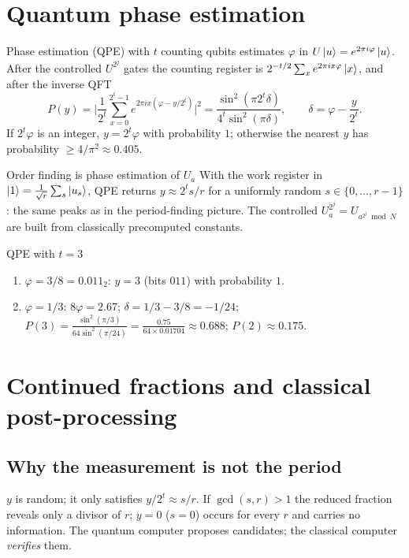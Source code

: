 \documentclass[11pt,a4paper,openany]{book}
\newcounter{wex}[chapter]
\newenvironment{steps}{\begin{enumerate}[label=\textbf{Step \arabic*.}, leftmargin=4.2em, itemsep=2pt]}{\end{enumerate}}
\begin{document}
\section{Quantum phase estimation}
Phase estimation (QPE) with $t$ counting qubits estimates $\varphi$ in $U\ket u = e^{2\pi i\varphi}\ket u$. After the controlled $U^{2^j}$ gates the counting register
is $2^{-t/2}\sum_xe^{2\pi ix\varphi}\ket x$, and after the inverse QFT
\[ P(y) = \Big|\frac{1}{2^t}\sum_{x=0}^{2^t-1}e^{2\pi ix(\varphi - y/2^t)}\Big|^2 = \frac{\sin^2(\pi2^t\delta)}{4^t\sin^2(\pi\delta)},\qquad \delta = \varphi - \frac{y}{2^t}. \]
If $2^t\varphi$ is an integer, $y = 2^t\varphi$ with probability $1$; otherwise the nearest $y$ has probability $\ge 4/\pi^2 \approx 0.405$.

\begin{keyres}{Order finding is phase estimation of $U_a$}
With the work register in $\ket1 = \frac{1}{\sqrt r}\sum_s\ket{u_s}$, QPE returns $y \approx 2^ts/r$ for a uniformly random $s \in \{0, \dots, r - 1\}$: the same peaks as
in the period-finding picture. The controlled $U_a^{2^j} = U_{a^{2^j} \bmod N}$ are built from classically precomputed constants.
\end{keyres}

\begin{wexample}{QPE with $t = 3$}
\begin{steps}
\item $\varphi = 3/8 = 0.011_2$: $y = 3$ (bits $011$) with probability $1$.
\item $\varphi = 1/3$: $8\varphi = 2.67$; $\delta = 1/3 - 3/8 = -1/24$; $P(3) = \frac{\sin^2(\pi/3)}{64\sin^2(\pi/24)} = \frac{0.75}{64\times0.01704} \approx 0.688$; $P(2) \approx 0.175$.
\end{steps}
\end{wexample}

\section{Continued fractions and classical post-processing}
\subsection{Why the measurement is not the period}
$y$ is random; it only satisfies $y/2^t \approx s/r$. If $\gcd(s, r) > 1$ the reduced fraction reveals only a divisor of $r$; $y = 0$ ($s = 0$) occurs for
every $r$ and carries no information. The quantum computer proposes candidates; the classical computer \emph{verifies} them.
\end{document}
